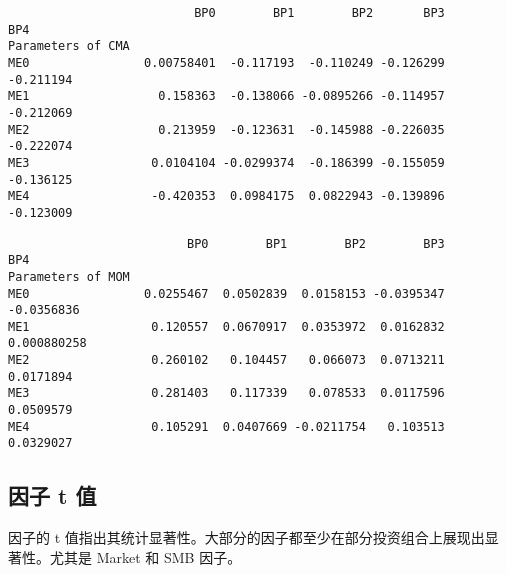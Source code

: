 \documentclass[11pt]{article}
\begin{document}
    
    
    \begin{verbatim}
                          BP0        BP1        BP2       BP3       BP4
Parameters of CMA                                                      
ME0                0.00758401  -0.117193  -0.110249 -0.126299 -0.211194
ME1                  0.158363  -0.138066 -0.0895266 -0.114957 -0.212069
ME2                  0.213959  -0.123631  -0.145988 -0.226035 -0.222074
ME3                 0.0104104 -0.0299374  -0.186399 -0.155059 -0.136125
ME4                 -0.420353  0.0984175  0.0822943 -0.139896 -0.123009
    \end{verbatim}

    
    
    \begin{verbatim}
                         BP0        BP1        BP2        BP3          BP4
Parameters of MOM                                                         
ME0                0.0255467  0.0502839  0.0158153 -0.0395347   -0.0356836
ME1                 0.120557  0.0670917  0.0353972  0.0162832  0.000880258
ME2                 0.260102   0.104457   0.066073  0.0713211    0.0171894
ME3                 0.281403   0.117339   0.078533  0.0117596    0.0509579
ME4                 0.105291  0.0407669 -0.0211754   0.103513    0.0329027
    \end{verbatim}

    
    \subsection{因子 t 值}\label{ux56e0ux5b50-t-ux503c}

因子的 t
值指出其统计显著性。大部分的因子都至少在部分投资组合上展现出显著性。尤其是
Market 和 SMB 因子。
\end{document}
